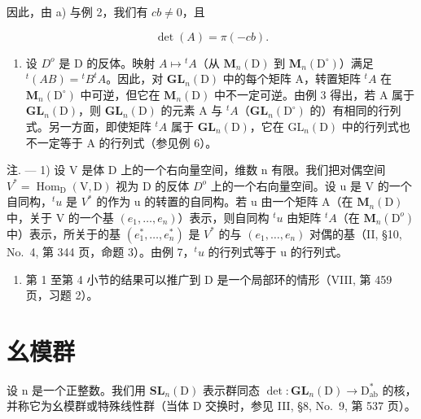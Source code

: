 因此，由 a) 与例 2，我们有 \(cb \neq 0\)，且

\[
\det (A) = \pi (- c b).\tag{27}
\]

\begin{enumerate}
\def\labelenumi{\arabic{enumi})}
\setcounter{enumi}{6}
\tightlist
\item
  设 \(D^{o}\) 是 D 的反体。映射 \(A \mapsto {}^{t}A\)（从 \(\mathbf{M}_{n}(\mathrm{D})\) 到 \(\mathbf{M}_{n}(\mathrm{D}^{\circ})\)）满足 \({}^{t}(AB) = {}^{t}B^{t}A\)。因此，对 \(\mathbf{GL}_{n}(\mathrm{D})\) 中的每个矩阵 A，转置矩阵 \({}^{t}A\) 在 \(\mathbf{M}_{n}(\mathrm{D}^{\circ})\) 中可逆，但它在 \(\mathbf{M}_{n}(\mathrm{D})\) 中不一定可逆。由例 3 得出，若 A 属于 \(\mathbf{GL}_{n}(\mathrm{D})\)，则 \(\mathbf{GL}_{n}(\mathrm{D})\) 的元素 A 与 \({}^{t}A\)（\(\mathbf{GL}_{n}(\mathrm{D}^{\circ})\) 的）有相同的行列式。另一方面，即使矩阵 \({}^{t}A\) 属于 \(\mathbf{GL}_{n}(\mathrm{D})\)，它在 \(\mathrm{GL}_{n}(\mathrm{D})\) 中的行列式也不一定等于 A 的行列式（参见例 6）。
\end{enumerate}

注. --- 1) 设 V 是体 D 上的一个右向量空间，维数 n 有限。我们把对偶空间 \(V^{*} = \operatorname{Hom}_{\mathrm{D}}(\mathrm{V}, \mathrm{D})\) 视为 D 的反体 \(D^{o}\) 上的一个右向量空间。设 u 是 V 的一个自同构，\(^{t}u\) 是 \(V^{*}\) 的作为 u 的转置的自同构。若 u 由一个矩阵 A（在 \(\mathbf{M}_{n}(\mathrm{D})\) 中，关于 V 的一个基 \((e_{1}, \ldots, e_{n})\)）表示，则自同构 \(^{t}u\) 由矩阵 \(^{t}A\)（在 \(\mathbf{M}_{n}(\mathrm{D}^{o})\) 中）表示，所关于的基 \((e_{1}^{*}, \ldots, e_{n}^{*})\) 是 \(V^{*}\) 的与 \((e_{1}, \ldots, e_{n})\) 对偶的基（II, §10, No.~4, 第 344 页，命题 3）。由例 7，\(^{t}u\) 的行列式等于 u 的行列式。

\begin{enumerate}
\def\labelenumi{\arabic{enumi})}
\setcounter{enumi}{1}
\tightlist
\item
  第 1 至第 4 小节的结果可以推广到 D 是一个局部环的情形（VIII, 第 459 页，习题 2）。
\end{enumerate}

\section{幺模群}

设 n 是一个正整数。我们用 \(\mathbf{SL}_{n}(\mathrm{D})\) 表示群同态 \(\det: \mathbf{GL}_{n}(\mathrm{D}) \to \mathrm{D}_{\mathrm{ab}}^{*}\) 的核，并称它为幺模群或特殊线性群（当体 D 交换时，参见 III, §8, No.~9, 第 537 页）。


